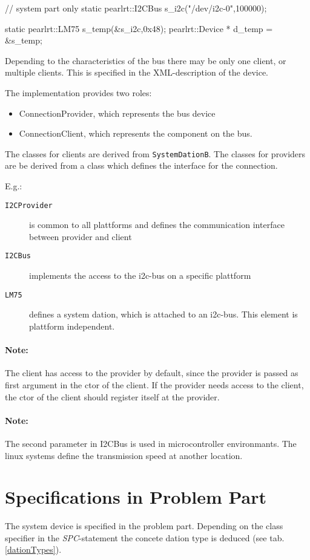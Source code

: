 \begin{CppCode}
// system part only
static pearlrt::I2CBus s_i2c("/dev/i2c-0",100000);

static pearlrt::LM75 s_temp(&s_i2c,0x48);
       pearlrt::Device * d_temp = &s_temp;
\end{CppCode}

Depending to the characteristics of the bus there may be only one client,
or multiple clients. This is specified in the XML-description of the 
device.

The implementation provides two roles:
\begin{itemize}
\item ConnectionProvider, which represents the bus device
\item ConnectionClient, which represents the component on the bus.
\end{itemize}

The classes for clients are derived from \texttt{SystemDationB}.
The classes for providers are be derived from a class which
defines the interface for the connection. 

E.g.:
\begin{description} 
\item[ \texttt{I2CProvider} ] is common to all plattforms
   and defines the communication interface between provider and client
\item[ \texttt{I2CBus}] implements the access to the i2c-bus on a 
   specific plattform
\item[ \texttt{LM75} ] defines a system dation, which is attached to an i2c-bus.
    This element is plattform independent.
\end{description}

\paragraph{Note:} The client has access to the provider by default, since
the provider is passed as first argument in the ctor of the client.
If the provider needs access to the client, the ctor of the client
should register itself at the provider.


\paragraph{Note:} The second parameter in I2CBus is used in microcontroller
   environmants. The linux systems define the transmission speed at
   another location.

\section{Specifications in Problem Part}
The system device is specified in the problem part.
Depending on the class specifier in the {\em SPC}-statement the concete 
dation type is deduced (see tab. \ref{dationTypes}).

